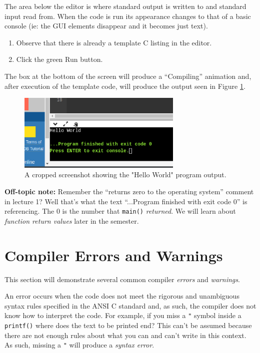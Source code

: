 \documentclass{lab}
\begin{document}
The area below the editor is where standard output is written to and standard input read from. When the code is run its appearance changes to that of a basic console (ie: the GUI elements disappear and it becomes just text).

\begin{task}{}{}
\begin{enumerate}
\item Observe that there is already a template C listing in the editor.
\item Click the green Run button.
\end{enumerate}
The box at the bottom of the screen will produce a ``Compiling'' animation and, after execution of the template code, will produce the output seen in Figure \ref{fig:onlinegdb_hello}.
\end{task}

\begin{figure}[H]
\begin{center}
\includegraphics[width=0.7\textwidth]{Wk1Images/onlinegdb_hello.png}
\end{center}
\caption{A cropped screenshot showing the "Hello World" program output.}\label{fig:onlinegdb_hello}
\end{figure}

\textbf{Off-topic note:} Remember the ``returns zero to the operating system'' comment in lecture 1? Well that's what the text ``...Program finished with exit code 0'' is referencing. The 0 is the number that \texttt{main()} \textit{returned}. We will learn about \textit{function return values} later in the semester.

\pagebreak
\section{Compiler Errors and Warnings}

This section will demonstrate several common compiler \textit{errors} and \textit{warnings}.

An error occurs when the code does not meet the rigorous and unambiguous syntax rules specified in the ANSI C standard and, as such, the compiler does not know how to interpret the code. For example, if you miss a \texttt{"} symbol inside a \texttt{printf()} where does the text to be printed end? This can't be assumed because there are not enough rules about what you can and can't write in this context. As such, missing a \texttt{"} will produce a \textit{syntax error}.
\end{document}
